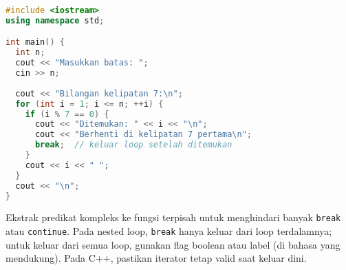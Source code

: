 \documentclass[../main.tex]{subfiles}
\begin{document}
\begin{lstlisting}[language=C++, caption={break saat menemukan kondisi (C++)}]
#include <iostream>
using namespace std;

int main() {
  int n;
  cout << "Masukkan batas: ";
  cin >> n;
  
  cout << "Bilangan kelipatan 7:\n";
  for (int i = 1; i <= n; ++i) {
    if (i % 7 == 0) {
      cout << "Ditemukan: " << i << "\n";
      cout << "Berhenti di kelipatan 7 pertama\n";
      break;  // keluar loop setelah ditemukan
    }
    cout << i << " ";
  }
  cout << "\n";
}
\end{lstlisting}

Ekstrak predikat kompleks ke fungsi terpisah untuk menghindari banyak \texttt{break} atau \texttt{continue}. Pada nested loop, \texttt{break} hanya keluar dari loop terdalamnya; untuk keluar dari semua loop, gunakan flag boolean atau label (di bahasa yang mendukung). Pada C++, pastikan iterator tetap valid saat keluar dini.
\end{document}
